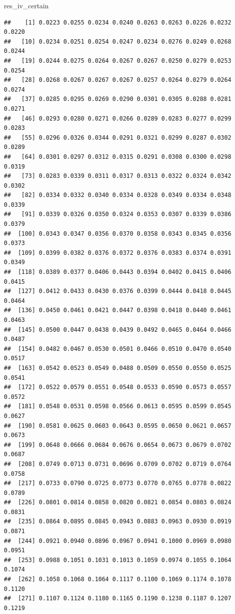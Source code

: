 \documentclass[]{article}
\newenvironment{Shaded}{\begin{snugshade}}{\end{snugshade}}
\newcommand{\NormalTok}[1]{{#1}}
\begin{document}
\begin{Shaded}
\begin{Highlighting}[]
\NormalTok{res_iv_certain}
\end{Highlighting}
\end{Shaded}

\begin{verbatim}
##    [1] 0.0223 0.0255 0.0234 0.0240 0.0263 0.0263 0.0226 0.0232 0.0220
##   [10] 0.0234 0.0251 0.0254 0.0247 0.0234 0.0276 0.0249 0.0268 0.0244
##   [19] 0.0244 0.0275 0.0264 0.0267 0.0267 0.0250 0.0279 0.0253 0.0254
##   [28] 0.0268 0.0267 0.0267 0.0267 0.0257 0.0264 0.0279 0.0264 0.0274
##   [37] 0.0285 0.0295 0.0269 0.0290 0.0301 0.0305 0.0288 0.0281 0.0271
##   [46] 0.0293 0.0280 0.0271 0.0266 0.0289 0.0283 0.0277 0.0299 0.0283
##   [55] 0.0296 0.0326 0.0344 0.0291 0.0321 0.0299 0.0287 0.0302 0.0289
##   [64] 0.0301 0.0297 0.0312 0.0315 0.0291 0.0308 0.0300 0.0298 0.0319
##   [73] 0.0283 0.0339 0.0311 0.0317 0.0313 0.0322 0.0324 0.0342 0.0302
##   [82] 0.0334 0.0332 0.0340 0.0334 0.0328 0.0349 0.0334 0.0348 0.0339
##   [91] 0.0339 0.0326 0.0350 0.0324 0.0353 0.0307 0.0339 0.0386 0.0379
##  [100] 0.0343 0.0347 0.0356 0.0370 0.0358 0.0343 0.0345 0.0356 0.0373
##  [109] 0.0399 0.0382 0.0376 0.0372 0.0376 0.0383 0.0374 0.0391 0.0349
##  [118] 0.0389 0.0377 0.0406 0.0443 0.0394 0.0402 0.0415 0.0406 0.0415
##  [127] 0.0412 0.0433 0.0430 0.0376 0.0399 0.0444 0.0418 0.0445 0.0464
##  [136] 0.0450 0.0461 0.0421 0.0447 0.0398 0.0418 0.0440 0.0461 0.0463
##  [145] 0.0500 0.0447 0.0438 0.0439 0.0492 0.0465 0.0464 0.0466 0.0487
##  [154] 0.0482 0.0467 0.0530 0.0501 0.0466 0.0510 0.0470 0.0540 0.0517
##  [163] 0.0542 0.0523 0.0549 0.0488 0.0509 0.0550 0.0550 0.0525 0.0541
##  [172] 0.0522 0.0579 0.0551 0.0548 0.0533 0.0590 0.0573 0.0557 0.0572
##  [181] 0.0548 0.0531 0.0598 0.0566 0.0613 0.0595 0.0599 0.0545 0.0627
##  [190] 0.0581 0.0625 0.0603 0.0643 0.0595 0.0650 0.0621 0.0657 0.0673
##  [199] 0.0648 0.0666 0.0684 0.0676 0.0654 0.0673 0.0679 0.0702 0.0687
##  [208] 0.0749 0.0713 0.0731 0.0696 0.0709 0.0702 0.0719 0.0764 0.0758
##  [217] 0.0733 0.0790 0.0725 0.0773 0.0770 0.0765 0.0778 0.0822 0.0789
##  [226] 0.0801 0.0814 0.0858 0.0820 0.0821 0.0854 0.0803 0.0824 0.0831
##  [235] 0.0864 0.0895 0.0845 0.0943 0.0883 0.0963 0.0930 0.0919 0.0871
##  [244] 0.0921 0.0940 0.0896 0.0967 0.0941 0.1000 0.0969 0.0980 0.0951
##  [253] 0.0988 0.1051 0.1031 0.1013 0.1059 0.0974 0.1055 0.1064 0.1074
##  [262] 0.1058 0.1068 0.1064 0.1117 0.1100 0.1069 0.1174 0.1078 0.1120
##  [271] 0.1107 0.1124 0.1180 0.1165 0.1190 0.1238 0.1187 0.1207 0.1219

\end{verbatim}
\end{document}
